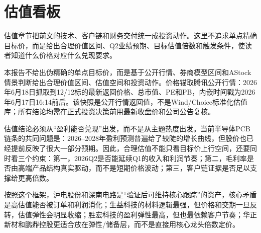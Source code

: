 \section{估值看板}

估值章节把前文的技术、客户链和财务交付统一成投资动作。这里不追求单点精确目标价，而是给出合理价值区间、Q2业绩预期、目标估值倍数和触发条件，使读者知道什么价格对应什么兑现要求。

\begin{sourcequalitybox}[估值边界]
本报告不给出伪精确的单点目标价，而是基于公开行情、券商模型区间和AStock情景判断给出合理价值区间、估值空间和投资动作。价格锚取腾讯公开行情：2026年6月18日抓取到12/12标的最新返回价格、总市值、PE和PB，内嵌时间戳为2026年6月17日16:14前后。该快照是公开行情返回值，不是Wind/Choice标准化估值库；所有结论均需在正式投资决策前用最新收盘价和公司公告复核。
\end{sourcequalitybox}

估值结论必须从“盈利能否兑现”出发，而不是从主题热度出发。当前半导体PCB链条的共同问题是：2026--2028年盈利预测普遍给了较陡的增长曲线，但股价也已经提前反映了很大一部分预期。因此，合理估值不能只看目标价上行空间，还要同时看三个约束：第一，2026Q2是否能延续Q1的收入和利润节奏；第二，毛利率是否由高端产品结构真实驱动，而不是短期价格波动；第三，客户链证据是否足以支撑给更高倍数。

按照这个框架，沪电股份和深南电路是“验证后可维持核心跟踪”的资产，核心矛盾是高估值能否被订单和利润消化；生益科技的材料逻辑最强，但价格和交期一旦反转，估值弹性会明显收缩；胜宏科技的盈利弹性最高，但也最依赖客户节奏；华正新材和鹏鼎控股更适合放在弹性/储备层，而不是直接用核心龙头倍数定价。

